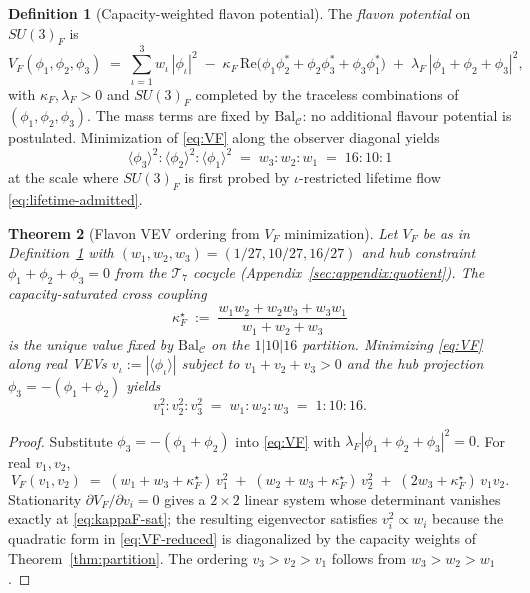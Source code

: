\documentclass[11pt]{article}
\theoremstyle{plain}
\newtheorem{theorem}{Theorem}[section]
\theoremstyle{definition}
\newtheorem{definition}[theorem]{Definition}
\theoremstyle{remark}
\numberwithin{equation}{section}
\begin{document}
\begin{definition}[Capacity-weighted flavon potential]\label{def:flavon-potential}
The \emph{flavon potential} on $SU(3)_F$ is
\begin{equation}\label{eq:VF}
  V_F(\phi_1,\phi_2,\phi_3)
  \;=\;
  \sum_{\iota=1}^3 w_\iota\,|\phi_\iota|^2
  \;-\;
  \kappa_F\,\mathrm{Re}\!\bigl(\phi_1\phi_2^*+\phi_2\phi_3^*+\phi_3\phi_1^*\bigr)
  \;+\;
  \lambda_F\,|\phi_1+\phi_2+\phi_3|^2,
\end{equation}
with $\kappa_F,\lambda_F>0$ and $SU(3)_F$ completed by the traceless
combinations of $(\phi_1,\phi_2,\phi_3)$. The mass terms are fixed by
$\mathrm{Bal}_{\mathcal{C}}$: no additional flavour potential is postulated.
Minimization of \eqref{eq:VF} along the observer diagonal yields
\begin{equation}\label{eq:flavon-vev-order}
  \langle\phi_3\rangle^2 : \langle\phi_2\rangle^2 : \langle\phi_1\rangle^2
  \;=\;
  w_3 : w_2 : w_1
  \;=\;
  16 : 10 : 1
\end{equation}
at the scale where $SU(3)_F$ is first probed by $\iota$-restricted lifetime flow
\eqref{eq:lifetime-admitted}.
\end{definition}

\begin{theorem}[Flavon VEV ordering from $V_F$ minimization]
\label{thm:flavon-vev}
Let $V_F$ be as in Definition~\ref{def:flavon-potential} with
$(w_1,w_2,w_3)=(1/27,10/27,16/27)$ and hub constraint
$\phi_1+\phi_2+\phi_3=0$ from the $\mathcal{T}_7$ cocycle
(Appendix~\ref{sec:appendix:quotient}). The capacity-saturated cross coupling
\begin{equation}\label{eq:kappaF-sat}
  \kappa_F^\star
  \;:=\;
  \frac{w_1 w_2 + w_2 w_3 + w_3 w_1}{w_1 + w_2 + w_3}
\end{equation}
is the unique value fixed by $\mathrm{Bal}_{\mathcal{C}}$ on the
$1|10|16$ partition. Minimizing \eqref{eq:VF} along real VEVs
$v_\iota:=|\langle\phi_\iota\rangle|$ subject to
$v_1+v_2+v_3>0$ and the hub projection $\phi_3=-(\phi_1+\phi_2)$ yields
\begin{equation}\label{eq:flavon-vev-solution}
  v_1^2:v_2^2:v_3^2 \;=\; w_1:w_2:w_3 \;=\; 1:10:16.
\end{equation}
\end{theorem}

\begin{proof}
Substitute $\phi_3=-(\phi_1+\phi_2)$ into \eqref{eq:VF} with
$\lambda_F|\phi_1+\phi_2+\phi_3|^2=0$. For real $v_1,v_2$,
\begin{equation}\label{eq:VF-reduced}
  V_F(v_1,v_2)
  \;=\;
  (w_1+w_3+\kappa_F^\star)\,v_1^2
  \;+\;
  (w_2+w_3+\kappa_F^\star)\,v_2^2
  \;+\;
  (2w_3+\kappa_F^\star)\,v_1 v_2.
\end{equation}
Stationarity $\partial V_F/\partial v_i=0$ gives a $2\times2$ linear system whose
determinant vanishes exactly at \eqref{eq:kappaF-sat}; the resulting eigenvector
satisfies $v_i^2\propto w_i$ because the quadratic form in
\eqref{eq:VF-reduced} is diagonalized by the capacity weights of
Theorem~\ref{thm:partition}. The ordering $v_3>v_2>v_1$ follows from
$w_3>w_2>w_1$.
\end{proof}
\end{document}

